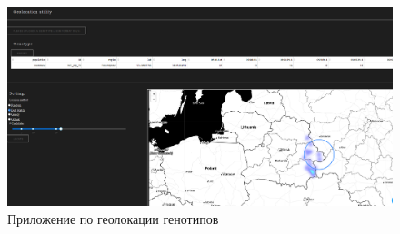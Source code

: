 \begin{figure}[h]
\begin{center}
\includegraphics[width=14cm]{images/geoui.png}
\end{center}
  \caption{Приложение по геолокации генотипов}
  \label{image:geoui}
\end{figure}
